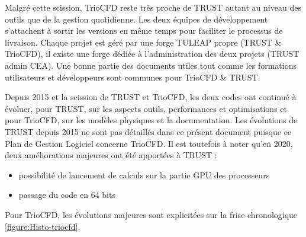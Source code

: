 Malgr\'e cette scission, TrioCFD reste tr\`es proche de TRUST autant au niveau
des outils que de la gestion quotidienne. Les deux équipes de développement s'attachent \`a sortir les versions en 
m\^eme temps pour faciliter le processus de livraison. Chaque projet est g\'er\'e par 
une forge TULEAP propre (TRUST \& TrioCFD), il existe une forge d\'edi\'ee \`a l'administration des deux projets (TRUST admin CEA). Une bonne partie des documents utiles tout comme les formations utilisateurs et d\'eveloppeurs sont communes pour TrioCFD \& TRUST.\smallskip\newline

Depuis 2015 et la scission de TRUST et TrioCFD, les deux codes ont continu\'e \`a \'evoluer, pour TRUST, sur les aspects outils, performances et optimisations et pour TrioCFD, sur les mod\`eles physiques et la documentation. Les \'evolutions de TRUST depuis 2015 ne sont pas d\'etaill\'es dans ce pr\'esent document puisque ce Plan de Gestion Logiciel concerne TrioCFD. Il est toutefois \`a noter qu'en 2020, deux am\'eliorations majeures ont \'et\'e apportées à TRUST :
\begin{itemize}
	\item possibilit\'e de lancement de calculs sur la partie GPU des processeurs
	\item passage du code en 64 bits
\end{itemize}
\vspace{1cm}
Pour TrioCFD, les \'evolutions majeures sont explicit\'ees sur la frise chronologique \ref{figure:Histo-triocfd}.

\usetikzlibrary{math}

